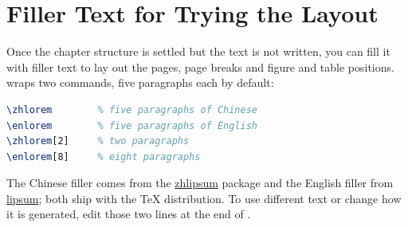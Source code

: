 \section{Filler Text for Trying the Layout}

Once the chapter structure is settled but the text is not written, you can fill it with filler text to lay out the pages, page breaks and figure and table positions.  wraps two commands, five paragraphs each by default:

\begin{lstlisting}[language=latex]
\zhlorem        % five paragraphs of Chinese
\enlorem        % five paragraphs of English
\zhlorem[2]     % two paragraphs
\enlorem[8]     % eight paragraphs
\end{lstlisting}

The Chinese filler comes from the \href{https://ctan.org/pkg/zhlipsum}{zhlipsum} package and the English filler from \href{https://ctan.org/pkg/lipsum}{lipsum}; both ship with the \TeX{} distribution. To use different text or change how it is generated, edit those two lines at the end of .
